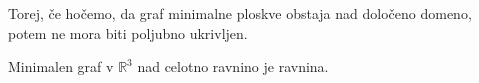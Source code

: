 \documentclass[8pt]{beamer}
\theoremstyle{definition}
\theoremstyle{remark}
\theoremstyle{plain}
\numberwithin{equation}{section}  %
\begin{document}
\begin{frame}
\begin{columns}
\begin{column}{0.5\textwidth}
            
        \end{column}
    \end{columns}

    \textcolor{red1}{Torej, če hočemo, da graf minimalne ploskve obstaja nad določeno domeno, potem ne mora biti poljubno ukrivljen.} 
    
    \vspace{0.8em}

    Minimalen graf v $\mathbb{R}^3$ nad celotno ravnino je ravnina. 

\end{frame}
\end{document}
